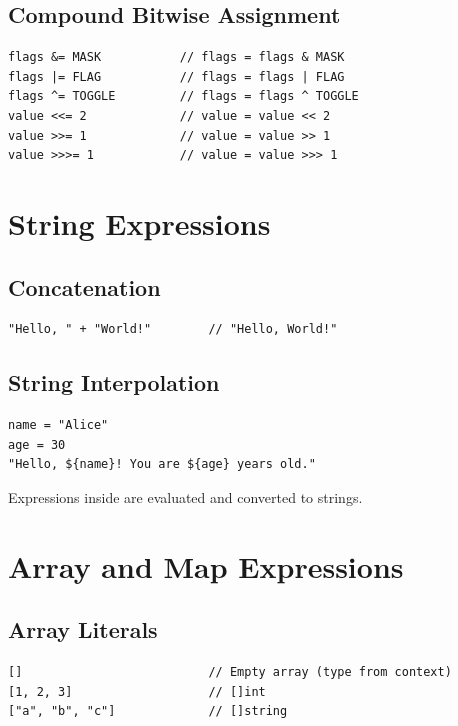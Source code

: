 \subsection{Compound Bitwise Assignment}

\begin{lstlisting}
flags &= MASK           // flags = flags & MASK
flags |= FLAG           // flags = flags | FLAG
flags ^= TOGGLE         // flags = flags ^ TOGGLE
value <<= 2             // value = value << 2
value >>= 1             // value = value >> 1
value >>>= 1            // value = value >>> 1
\end{lstlisting}

\section{String Expressions}

\subsection{Concatenation}

\begin{lstlisting}
"Hello, " + "World!"        // "Hello, World!"
\end{lstlisting}

\subsection{String Interpolation}

\begin{lstlisting}
name = "Alice"
age = 30
"Hello, ${name}! You are ${age} years old."
\end{lstlisting}

Expressions inside  are evaluated and converted to strings.

\section{Array and Map Expressions}

\subsection{Array Literals}

\begin{lstlisting}
[]                          // Empty array (type from context)
[1, 2, 3]                   // []int
["a", "b", "c"]             // []string
\end{lstlisting}

